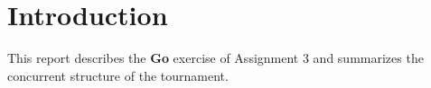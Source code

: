 \section{Introduction}

This report describes the \textbf{Go} exercise of Assignment 3 and summarizes the concurrent structure of the tournament.
